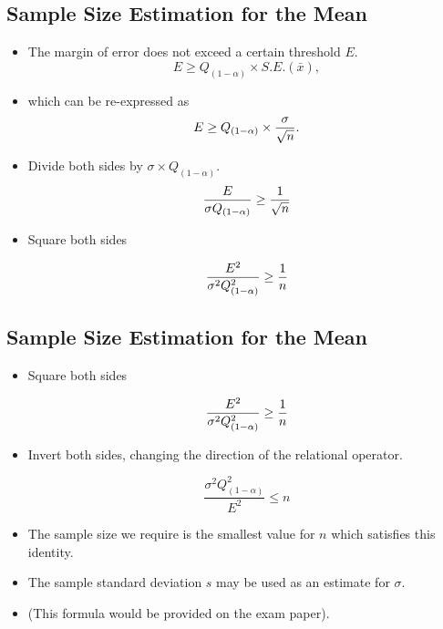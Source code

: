 \documentclass[]{report}
\begin{document}

\subsection{Sample Size Estimation for the Mean}

\begin{itemize}

\item The margin of error does not exceed a certain threshold $E$.
\[ E \geq Q_{(1-\alpha)} \times S.E.(\bar{x}), \]

\item which can be re-expressed as
\[E \geq Q_{(1-\alpha)} \times {\sigma \over \sqrt{n} }.\]

\item Divide both sides by $\sigma \times Q_{(1-\alpha)}$.
\[ \frac{E}{\sigma Q_{(1-\alpha)}} \geq {1 \over \sqrt{n} } \]

\item Square both sides

\[ \frac{E^2}{\sigma^2 Q_{(1-\alpha)}^2} \geq {1 \over n } \]


\end{itemize}


\subsection{Sample Size Estimation for the Mean}

\begin{itemize}
\item Square both sides

\[ \frac{E^2}{\sigma^2 Q^2_{(1-\alpha)}} \geq {1 \over n } \]

\item Invert both sides, changing the direction of the relational operator.

\[ \frac{\sigma^2 Q^2_{(1-\alpha)}}{E^2} \leq n \]


\item The sample size we require is the smallest value for $n$ which satisfies this identity.
\item The sample standard deviation $s$ may be used as an estimate for $\sigma$.
\item (This formula would be provided on the exam paper).
\end{itemize}
\end{document}
